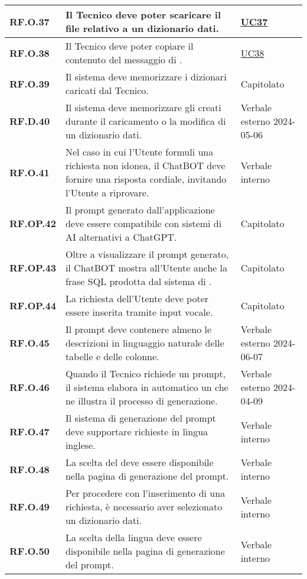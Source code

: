 \begin{adjustwidth}{-0.5cm}{-0.5cm}
\begin{longtable}{|P{3cm}|P{6,5cm}|>{\arraybackslash}P{4cm}|}
    \hline
    \textbf{RF.O.37} & Il Tecnico deve poter scaricare il file relativo a un dizionario dati. & \hyperref[UC37]{UC37} \\
    \hline
    \textbf{RF.O.38} & Il Tecnico deve poter copiare il contenuto del messaggio di .  & \hyperref[UC38]{UC38} \\
    \hline
    \textbf{RF.O.39} & Il sistema deve memorizzare i dizionari caricati dal Tecnico. & Capitolato \\
    \hline
    \textbf{RF.D.40} & Il sistema deve memorizzare gli  creati durante il caricamento o la modifica di un dizionario dati. & Verbale esterno 2024-05-06\\
    \hline
    \textbf{RF.O.41} & Nel caso in cui l'Utente formuli una richiesta non idonea, il ChatBOT deve fornire una risposta cordiale, invitando l'Utente a riprovare. & Verbale interno \\
    \hline
    \textbf{RF.OP.42} & Il prompt generato dall'applicazione deve essere compatibile con sistemi di AI alternativi a ChatGPT. & Capitolato \\
    \hline
    \textbf{RF.OP.43} & Oltre a visualizzare il prompt generato, il ChatBOT mostra all'Utente anche la frase SQL prodotta dal sistema di . & Capitolato \\
    \hline
    \textbf{RF.OP.44} & La richiesta dell'Utente deve poter essere inserita tramite input vocale. & Capitolato \\
    \hline
    \textbf{RF.O.45} & Il prompt deve contenere almeno le descrizioni in linguaggio naturale delle tabelle e delle colonne. & Verbale esterno 2024-06-07\\
    \hline
    \textbf{RF.O.46} & Quando il Tecnico richiede un prompt, il sistema elabora in automatico un  che ne illustra il processo di generazione. & Verbale esterno 2024-04-09 \\
    \hline
    \textbf{RF.O.47} & Il sistema di generazione del prompt deve supportare richieste in lingua inglese. & Verbale interno \\
    \hline
    \textbf{RF.O.48} & La scelta del  deve essere disponibile nella pagina di generazione del prompt. & Verbale interno \\
    \hline
    \textbf{RF.O.49} & Per procedere con l'inserimento di una richiesta, è necessario aver selezionato un dizionario dati. & Verbale interno \\
    \hline
    \textbf{RF.O.50} & La scelta della lingua deve essere disponibile nella pagina di generazione del prompt. & Verbale interno \\

\end{longtable}
\end{adjustwidth}
